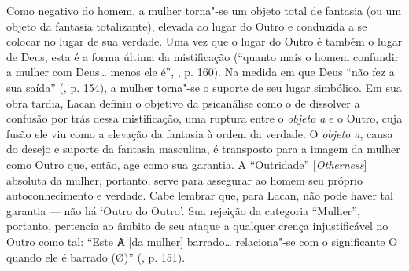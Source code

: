 Como negativo do homem, a mulher torna"-se um objeto total de fantasia
(ou um objeto da fantasia totalizante), elevada ao lugar do Outro e
conduzida a se colocar no lugar de sua verdade. Uma vez que o lugar do
Outro é também o lugar de Deus, esta é a forma última da mistificação
(``quanto mais o homem confundir a mulher com Deus\ldots{} menos ele é'',
, p. 160). Na medida em que Deus ``não fez a sua saída''
(, p. 154), a mulher torna"-se o suporte de seu lugar simbólico.
Em sua obra tardia, Lacan definiu o objetivo da psicanálise como o de
dissolver a confusão por trás dessa mistificação, uma ruptura entre o
\emph{objeto a} e o Outro, cuja fusão ele viu como a elevação da
fantasia à ordem da verdade. O \emph{objeto a}, causa do desejo e
suporte da fantasia masculina, é transposto para a imagem da mulher como
Outro que, então, age como sua garantia. A ``Outridade''
{[}\emph{Otherness}{]} absoluta da mulher, portanto, serve para
assegurar ao homem seu próprio autoconhecimento e verdade. Cabe lembrar
que, para Lacan, não pode haver tal garantia --- não há `Outro do Outro'.
Sua rejeição da categoria ``Mulher'', portanto, pertencia ao âmbito de
seu ataque a qualquer crença injustificável no Outro como tal: ``Este Ⱥ
{[}da mulher{]} barrado\ldots{} relaciona"-se com o significante O quando ele
é barrado (Ø)'' (, p. 151).

